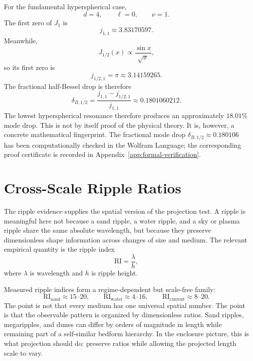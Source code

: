 \documentclass[11pt,a4paper]{article}
\renewcommand{\boxed}[1]{#1}
\begin{document}
For the fundamental hyperspherical case,
\begin{equation}
 d=4,\qquad \ell=0,\qquad \nu=1.
\label{eq:fundamental-case}
\end{equation}
The first zero of $J_1$ is
\begin{equation}
 j_{1,1}\approx 3.83170597.
\label{eq:j11}
\end{equation}
Meanwhile,
\begin{equation}
 J_{1/2}(x)\propto\frac{\sin x}{\sqrt{x}},
\label{eq:j-half-form}
\end{equation}
so its first zero is
\begin{equation}
 j_{1/2,1}=\pi\approx 3.14159265.
\label{eq:j-half-zero}
\end{equation}
The fractional half-Bessel drop is therefore
\begin{equation}
\boxed{
\delta_{B,1/2}=\frac{j_{1,1}-j_{1/2,1}}{j_{1,1}}\approx 0.1801060212.
}
\label{eq:half-drop-fingerprint}
\end{equation}
The lowest hyperspherical resonance therefore produces an approximately $18.01\%$ mode drop. This is not by itself proof of the physical theory. It is, however, a concrete mathematical fingerprint. The fractional mode drop $\delta_{B,1/2}\approx 0.180106$ has been computationally checked in the Wolfram Language; the corresponding proof certificate is recorded in Appendix~\ref{app:formal-verification}.

\section{Cross-Scale Ripple Ratios}

The ripple evidence supplies the spatial version of the projection test. A ripple is meaningful here not because a sand ripple, a water ripple, and a sky or plasma ripple share the same absolute wavelength, but because they preserve dimensionless shape information across changes of size and medium. The relevant empirical quantity is the ripple index
\begin{equation}
\mathrm{RI}=\frac{\lambda}{h},
\label{eq:ripple-index}
\end{equation}
where $\lambda$ is wavelength and $h$ is ripple height.

Measured ripple indices form a regime-dependent but scale-free family:
\begin{equation}
\mathrm{RI}_{\mathrm{sand}}\approx 15\text{--}20,\qquad
\mathrm{RI}_{\mathrm{water}}\approx 4\text{--}16,\qquad
\mathrm{RI}_{\mathrm{current}}\approx 8\text{--}20.
\label{eq:ripple-index-family}
\end{equation}
The point is not that every medium has one universal spatial number. The point is that the observable pattern is organized by dimensionless ratios. Sand ripples, megaripples, and dunes can differ by orders of magnitude in length while remaining part of a self-similar bedform hierarchy. In the enclosure picture, this is what projection should do: preserve ratios while allowing the projected length scale to vary.
\end{document}
